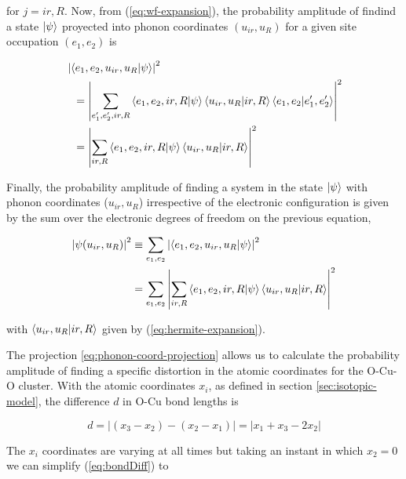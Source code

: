 \noindent for $j=ir,R$. 
Now, from (\ref{eq:wf-expansion}), the probability amplitude of findind a state $\left | \psi \right\rangle$ proyected into phonon coordinates $(u_{ir},u_R)$ for a given site occupation $(e_1,e_2)$ is

\begin{equation}
  \begin{split}
    & \left|\left\langle e_1,e_2,u_{ir},u_R|\psi\right\rangle\right|^2 \\
    & \ \ = \left|\sum_{e_1',e_2',ir,R}\left\langle e_1,e_2,ir,R|\psi\right\rangle\left\langle u_{ir},u_R|ir,R\right\rangle\left\langle e_1,e_2|e_1',e_2'\right\rangle\right|^2 \\
    & \ \ = \left|\sum_{ir,R}\left\langle e_1,e_2,ir,R|\psi\right\rangle\left\langle u_{ir},u_R|ir,R\right\rangle\right|^2
  \end{split}
\end{equation}

Finally, the probability amplitude of finding a system in the state $\left | \psi \right\rangle$ with phonon coordinates ($u_{ir},u_R$) irrespective of the electronic configuration is given by the sum over the electronic degrees of freedom on the previous equation,

\begin{equation}
  \label{eq:phonon-coord-projection}
  \begin{split}
    \left|\psi(u_{ir}, u_R)\right|^2 & \equiv \sum_{e_1,e_2}\left|\left\langle e_1,e_2,u_{ir},u_R|\psi\right\rangle\right|^2 \\
    & = \sum_{e_1,e_2} \left|\sum_{ir,R}\left\langle e_1,e_2,ir,R|\psi\right\rangle\left\langle u_{ir},u_R|ir,R\right\rangle\right|^2
  \end{split}
\end{equation}

\noindent with $\left\langle u_{ir},u_R|ir,R\right\rangle$ given by (\ref{eq:hermite-expansion}).

The projection \ref{eq:phonon-coord-projection} allows us to calculate the probability amplitude of finding a specific distortion in the atomic coordinates for the O-Cu-O cluster.
With the atomic coordinates $x_i$, as defined in section \ref{sec:isotopic-model}, the difference $d$ in O-Cu bond lengths is

\begin{equation}
  \label{eq:bondDiff}
  d= \left| (x_3 - x_2) - (x_2 - x_1) \right| = \left| x_1 + x_3 - 2x_2 \right|
\end{equation}

The $x_i$ coordinates are varying at all times but taking an instant in which $x_2=0$ we can simplify (\ref{eq:bondDiff}) to

